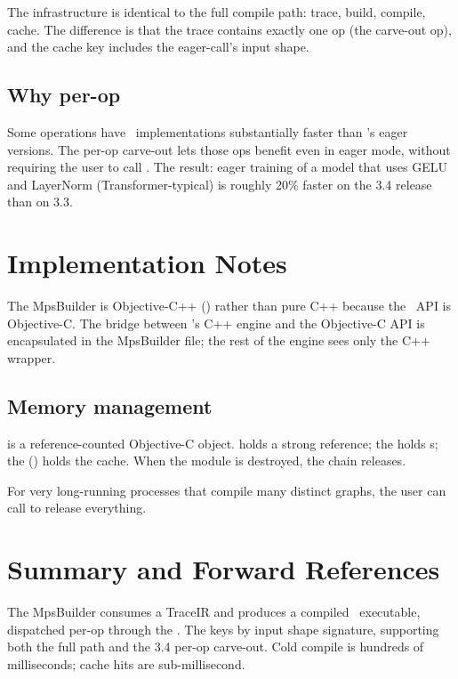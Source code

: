 The infrastructure is identical to the full compile path: trace,
build, compile, cache. The difference is that the trace contains
exactly one op (the carve-out op), and the cache key includes
the eager-call's input shape.

\subsection{Why per-op}
\label{ssec:mps_builder:why_per_op}

Some operations have \MPSGraph\ implementations substantially
faster than \MLX's eager versions. The per-op carve-out lets
those ops benefit even in eager mode, without requiring the user
to call . The result: eager training of a model
that uses GELU and LayerNorm (Transformer-typical) is roughly
20\% faster on the 3.4 release than on 3.3.

\section{Implementation Notes}
\label{sec:mps_builder:impl_notes}

The MpsBuilder is Objective-C++ () rather than pure
C++ because the \MPSGraph\ API is Objective-C. The bridge between
\Lucid's C++ engine and the Objective-C API is encapsulated in
the MpsBuilder file; the rest of the engine sees only the C++
 wrapper.

\subsection{Memory management}
\label{ssec:mps_builder:mem_mgmt}

 is a reference-counted Objective-C
object.  holds a strong reference; the
 holds s; the
 () holds the
cache. When the module is destroyed, the chain releases.

For very long-running processes that compile many distinct
graphs, the user can call 
to release everything.

\section{Summary and Forward References}
\label{sec:mps_builder:summary}

The MpsBuilder consumes a TraceIR and produces a compiled
\MPSGraph\ executable, dispatched per-op through the
. The  keys by input
shape signature, supporting both the full 
path and the 3.4 per-op carve-out. Cold compile is hundreds of
milliseconds; cache hits are sub-millisecond.


